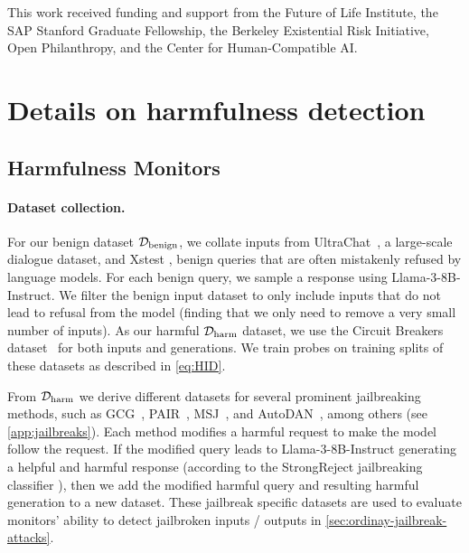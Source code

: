 \documentclass{article}
\begin{document}
This work received funding and support from the Future of Life Institute,
the SAP Stanford Graduate Fellowship, the Berkeley Existential Risk
Initiative, Open Philanthropy, and the Center for Human-Compatible AI.

\FloatBarrier








\newpage
\appendix


\section{Details on harmfulness detection}\label{sec:harmfulness-details}
\label{sec:appendix-harmfulness}

\subsection{Harmfulness Monitors}

\paragraph{Dataset collection.}
For our benign dataset $\mathcal{D}_\text{benign}$, we collate 
inputs from UltraChat~\citep{ding2023enhancing}, a large-scale 
dialogue dataset, and Xstest \citep{rottger2023xstest}, 
benign queries that are often
mistakenly refused by language models. 
For each benign query, we sample a
response using Llama-3-8B-Instruct. We filter
the benign input dataset to only include
inputs that do not lead to refusal from 
the model (finding that we only need 
to remove a very small number of inputs).
As our harmful $\mathcal{D}_\text{harm}$ dataset,
we use the Circuit Breakers dataset~\citep{zou2024improving}
for both inputs and generations.
We train probes
on training splits of these datasets as described in 
\cref{eq:HID}.

From $\mathcal{D}_\mathrm{harm}$ we derive different datasets for several prominent jailbreaking methods, such as
GCG~\citep{zou2023universal}, PAIR~\citep{chao2023jailbreaking}, MSJ~\citep{anil2024many}, and AutoDAN~\citep{liu2023autodan}, among others (see \cref{app:jailbreaks}). 
Each method modifies a harmful request to make the model follow the request.
If the modified query leads to Llama-3-8B-Instruct
generating a helpful and harmful response
(according to the StrongReject
jailbreaking classifier \citep{souly2024strongreject}),
then we add the modified harmful query and
resulting harmful generation to a new dataset. These jailbreak
specific datasets are used 
to evaluate monitors' ability 
to detect jailbroken
inputs / outputs in \cref{sec:ordinay-jailbreak-attacks}.
\end{document}
